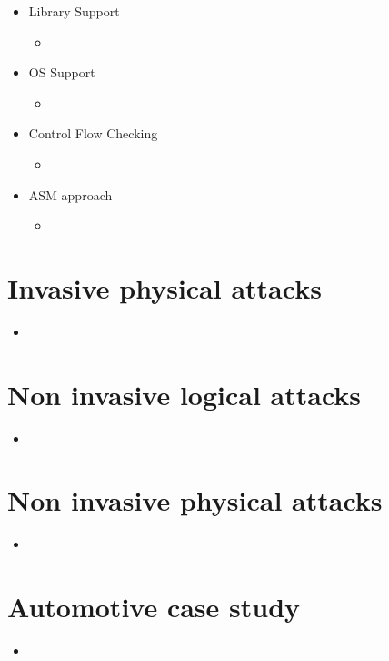 \documentclass[11pt, paper=a4, twocolumn]{scrartcl}
\begin{document}
\begin{itemize}
\begin{itemize}
					\item Library Support
						\begin{itemize}
							\item 
						\end{itemize}
					\item OS Support
						\begin{itemize}
							\item 
						\end{itemize}
					\item Control Flow Checking
						\begin{itemize}
							\item 
						\end{itemize}
					\item ASM approach
						\begin{itemize}
							\item 
						\end{itemize}
				\end{itemize}

		\end{itemize}

	\section{Invasive physical attacks}
		\begin{itemize}
			\item 
		\end{itemize}

	\section{Non invasive logical attacks}
		\begin{itemize}
			\item 
		\end{itemize}

	\section{Non invasive physical attacks}
		\begin{itemize}
			\item 
		\end{itemize}

	\section{Automotive case study}
		\begin{itemize}
			\item 
		\end{itemize}
\end{document}
